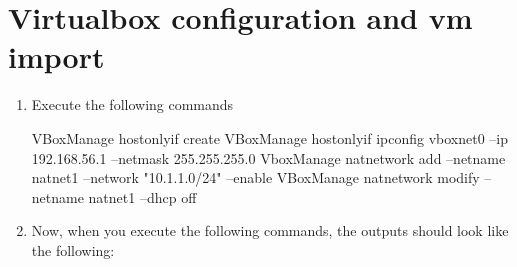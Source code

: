 \section{Virtualbox configuration and vm import}
\begin{enumerate}
\item Execute the following commands
\begin{tiny}
\begin{verbatimtab}[4]
VBoxManage hostonlyif create
VBoxManage hostonlyif ipconfig vboxnet0 --ip 192.168.56.1 --netmask 255.255.255.0
VboxManage natnetwork add --netname natnet1 --network "10.1.1.0/24" --enable
VBoxManage natnetwork modify --netname natnet1 --dhcp off
\end{verbatimtab}
\end{tiny}
\newpage
\item Now, when you execute the following commands, the outputs should look like the following:
\end{enumerate}
